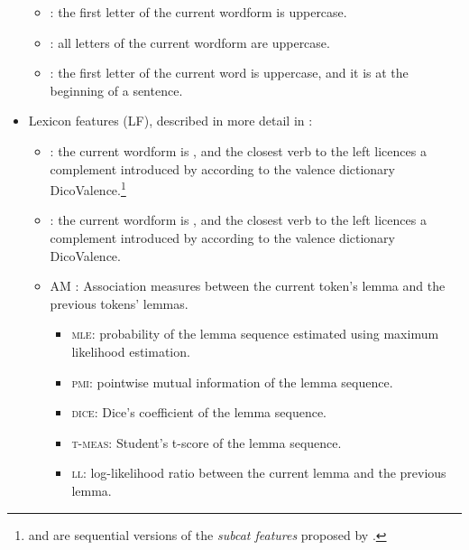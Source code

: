 \documentclass[output=paper,
modfonts
]{langscibook}
\begin{document}
\begin{itemize}
\begin{itemize}
\item {}: the first letter of the current wordform  is uppercase.
\item {}: all letters of the current wordform  are uppercase.
\item {}: the first letter of the current word  is uppercase, and it is at the beginning of a sentence.
\end{itemize}
\item Lexicon features %
({\textsc LF}), described in more detail in :
\begin{itemize}
\item {}: the current wordform  is , and the closest verb to the left licences a complement introduced by  according to the valence dictionary DicoValence.\footnote{ and  are sequential versions of the \emph{subcat features} proposed by \citet{nasr:acl:2015}.}
\item {}: the current wordform  is , and the closest verb to the left licences a complement introduced by  according to the valence dictionary DicoValence.
\item \textsc{AM} : Association measures between the current token's lemma  and the previous tokens' lemmas.
\begin{itemize}
\item \textsc{mle}: probability of the lemma sequence estimated using maximum likelihood estimation.
\item \textsc{pmi}: pointwise mutual information of the lemma sequence.
\item \textsc{dice}: Dice's coefficient of the lemma sequence.
\item \textsc{t-meas}: Student's t-score of the lemma sequence.
\item \textsc{ll}: log-likelihood ratio between the current lemma and the previous lemma.
\end{itemize}
\end{itemize}
\end{itemize}
\end{document}
